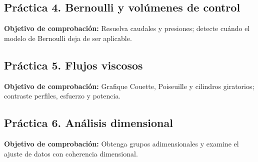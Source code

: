 \documentclass[10pt,openany]{book}
\begin{document}
\subsection*{Práctica 4. Bernoulli y volúmenes de control}
\noindent \textbf{Objetivo de comprobación:} Resuelva caudales y presiones; detecte cuándo el modelo de Bernoulli deja de ser aplicable.

\subsection*{Práctica 5. Flujos viscosos}
\noindent \textbf{Objetivo de comprobación:} Grafique Couette, Poiseuille y cilindros giratorios; contraste perfiles, esfuerzo y potencia.

\subsection*{Práctica 6. Análisis dimensional}
\noindent \textbf{Objetivo de comprobación:} Obtenga grupos adimensionales y examine el ajuste de datos con coherencia dimensional.
\end{document}
